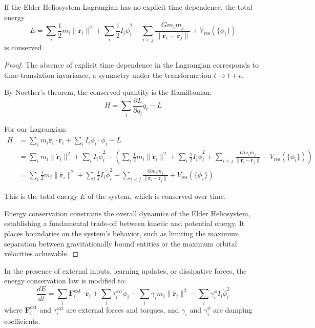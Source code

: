 \begin{theorem}
If the Elder Heliosystem Lagrangian has no explicit time dependence, the total energy
\begin{equation}
E = \sum_i \frac{1}{2}m_i\|\dot{\mathbf{r}}_i\|^2 + \sum_i \frac{1}{2}I_i\dot{\phi}_i^2 - \sum_{i < j} \frac{G m_i m_j}{\|\mathbf{r}_i - \mathbf{r}_j\|} + V_{\text{res}}(\{\phi_i\})
\end{equation}
is conserved.
\end{theorem}

\begin{proof}
The absence of explicit time dependence in the Lagrangian corresponds to time-translation invariance, a symmetry under the transformation $t \to t + \epsilon$.

By Noether's theorem, the conserved quantity is the Hamiltonian:
\begin{equation}
H = \sum_i \frac{\partial L}{\partial \dot{q}_i} \dot{q}_i - L
\end{equation}

For our Lagrangian:
\begin{align}
H &= \sum_i m_i \dot{\mathbf{r}}_i \cdot \dot{\mathbf{r}}_i + \sum_i I_i \dot{\phi}_i \cdot \dot{\phi}_i - L \\
&= \sum_i m_i \|\dot{\mathbf{r}}_i\|^2 + \sum_i I_i \dot{\phi}_i^2 - \left( \sum_i \frac{1}{2}m_i\|\dot{\mathbf{r}}_i\|^2 + \sum_i \frac{1}{2}I_i\dot{\phi}_i^2 + \sum_{i < j} \frac{G m_i m_j}{\|\mathbf{r}_i - \mathbf{r}_j\|} - V_{\text{res}}(\{\phi_i\}) \right) \\
&= \sum_i \frac{1}{2}m_i\|\dot{\mathbf{r}}_i\|^2 + \sum_i \frac{1}{2}I_i\dot{\phi}_i^2 - \sum_{i < j} \frac{G m_i m_j}{\|\mathbf{r}_i - \mathbf{r}_j\|} + V_{\text{res}}(\{\phi_i\})
\end{align}

This is the total energy $E$ of the system, which is conserved over time.

Energy conservation constrains the overall dynamics of the Elder Heliosystem, establishing a fundamental trade-off between kinetic and potential energy. It places boundaries on the system's behavior, such as limiting the maximum separation between gravitationally bound entities or the maximum orbital velocities achievable.
\end{proof}

\begin{theorem}
In the presence of external inputs, learning updates, or dissipative forces, the energy conservation law is modified to:
\begin{equation}
\frac{dE}{dt} = \sum_i \mathbf{F}_i^{\text{ext}} \cdot \dot{\mathbf{r}}_i + \sum_i \tau_i^{\text{ext}} \dot{\phi}_i - \sum_i \gamma_i m_i \|\dot{\mathbf{r}}_i\|^2 - \sum_i \gamma_i^{\phi} I_i \dot{\phi}_i^2
\end{equation}
where $\mathbf{F}_i^{\text{ext}}$ and $\tau_i^{\text{ext}}$ are external forces and torques, and $\gamma_i$ and $\gamma_i^{\phi}$ are damping coefficients.
\end{theorem}

